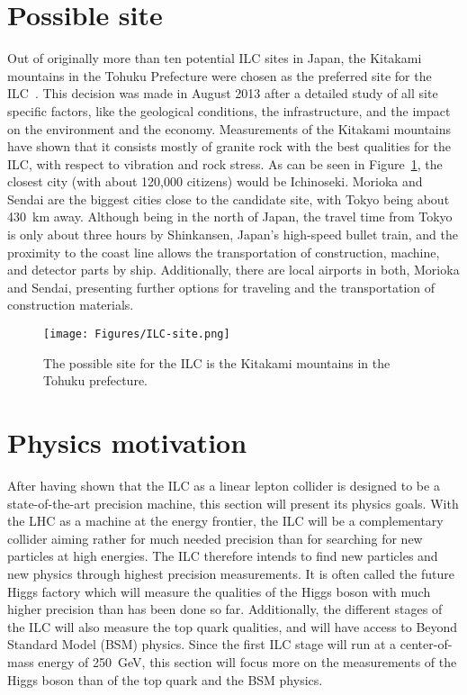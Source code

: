 \section{Possible site}
Out of originally more than ten potential ILC sites in Japan, the Kitakami mountains in the Tohuku Prefecture were chosen as the preferred site for the ILC~\cite{Site}.
This decision was made in August 2013 after a detailed study of all site specific factors, like the geological conditions, the infrastructure, and the impact on the environment and the economy.
Measurements of the Kitakami mountains have shown that it consists mostly of granite rock with the best qualities for the ILC, with respect to vibration and rock stress.
As can be seen in Figure~\ref{fig:ILC_Site}, the closest city (with about 120,000 citizens) would be Ichinoseki.
Morioka and Sendai are the biggest cities close to the candidate site, with Tokyo being about \SI{430}{\kilo\meter} away.
Although being in the north of Japan, the travel time from Tokyo is only about three hours by Shinkansen, Japan's high-speed bullet train, and the proximity to the coast line allows the transportation of construction, machine, and detector parts by ship.
Additionally, there are local airports in both, Morioka and Sendai, presenting further options for traveling and the transportation of construction materials.
\label{ILC:site}
\begin{figure}[h]
\centering
\texttt{[image: Figures/ILC-site.png]}
\caption[Possible site for the ILC]{The possible site for the ILC is the Kitakami mountains in the Tohuku prefecture.\cite{Kitakami}}
\label{fig:ILC_Site}
\end{figure}

\section{Physics motivation}
\label{ILC:physicsmotivation}
After having shown that the ILC as a linear lepton collider is designed to be a state-of-the-art precision machine, this section will present its physics goals.
With the LHC as a machine at the energy frontier, the ILC will be a complementary collider aiming rather for much needed precision than for searching for new particles at high energies.
The ILC therefore intends to find new particles and new physics through highest precision measurements.
It is often called the future Higgs factory which will measure the qualities of the Higgs boson with much higher precision than has been done so far.
Additionally, the different stages of the ILC will also measure the top quark qualities, and will have access to Beyond Standard Model (BSM) physics.
Since the first ILC stage will run at a center-of-mass energy of \SI{250}{\GeV}, this section will focus more on the measurements of the Higgs boson than of the top quark and the BSM physics.
 
